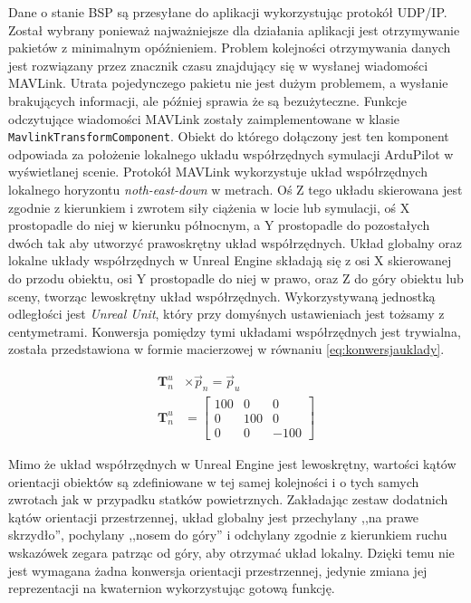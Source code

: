 Dane o stanie BSP są przesyłane do aplikacji wykorzystując protokół UDP/IP. Został wybrany ponieważ najważniejsze dla działania aplikacji jest otrzymywanie pakietów z minimalnym opóźnieniem. Problem kolejności otrzymywania danych jest rozwiązany przez znacznik czasu znajdujący się w wysłanej wiadomości MAVLink. Utrata pojedynczego pakietu nie jest dużym problemem, a wysłanie brakujących informacji, ale później sprawia że są bezużyteczne. Funkcje odczytujące wiadomości MAVLink zostały zaimplementowane w klasie \texttt{MavlinkTransformComponent}. Obiekt do którego dołączony jest ten komponent odpowiada za położenie lokalnego układu współrzędnych symulacji ArduPilot w wyświetlanej scenie. Protokół MAVLink wykorzystuje układ współrzędnych lokalnego horyzontu \emph{noth-east-down} w metrach. Oś Z tego układu skierowana jest zgodnie z kierunkiem i zwrotem siły ciążenia w locie lub symulacji, oś X prostopadle do niej w kierunku północnym, a Y prostopadle do pozostałych dwóch tak aby utworzyć prawoskrętny układ współrzędnych. Układ globalny oraz lokalne układy współrzędnych w Unreal Engine składają się z osi X skierowanej do przodu obiektu, osi Y prostopadle do niej w prawo, oraz Z do góry obiektu lub sceny, tworząc lewoskrętny układ współrzędnych. Wykorzystywaną jednostką odległości jest \emph{Unreal Unit}, który przy domyśnych ustawieniach jest tożsamy z centymetrami. Konwersja pomiędzy tymi układami współrzędnych jest trywialna, została przedstawiona w formie macierzowej w równaniu \ref{eq:konwersjauklady}.

\begin{align}
    \label{eq:konwersjauklady}
    \mathbf{T}_{n}^{u} & \times \vec{p}_{n} = \vec{p}_{u}
    \\
    \mathbf{T}_{n}^{u} & =
    \begin{bmatrix}
        100 & 0 & 0 \\
        0 & 100 & 0 \\
        0 & 0 & -100
    \end{bmatrix}
\end{align}

Mimo że układ współrzędnych w Unreal Engine jest lewoskrętny, wartości kątów orientacji obiektów są zdefiniowane w tej samej kolejności i o tych samych zwrotach jak w przypadku statków powietrznych. Zakładając zestaw dodatnich kątów orientacji przestrzennej, układ globalny jest przechylany ,,na prawe skrzydło'', pochylany ,,nosem do góry'' i odchylany zgodnie z kierunkiem ruchu wskazówek zegara patrząc od góry, aby otrzymać układ lokalny. Dzięki temu nie jest wymagana żadna konwersja orientacji przestrzennej, jedynie zmiana jej reprezentacji na kwaternion wykorzystując gotową funkcję.

